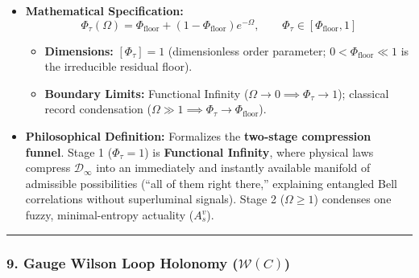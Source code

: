 \documentclass[
]{article}
\providecommand{\tightlist}{%
  \setlength{\itemsep}{0pt}\setlength{\parskip}{0pt}}
\begin{document}
\begin{itemize}
\tightlist
\item
  \textbf{Mathematical Specification:}
  \[\Phi_\tau(\Omega) = \Phi_{\mathrm{floor}} + (1 - \Phi_{\mathrm{floor}}) e^{-\Omega}, \qquad \Phi_\tau \in [\Phi_{\mathrm{floor}}, 1]\]

  \begin{itemize}
  \tightlist
  \item
    \textbf{Dimensions:} \([\Phi_\tau] = 1\) (dimensionless order
    parameter; \(0 < \Phi_{\mathrm{floor}} \ll 1\) is the irreducible
    residual floor).
  \item
    \textbf{Boundary Limits:} Functional Infinity
    (\(\Omega \to 0 \implies \Phi_\tau \to 1\)); classical record
    condensation
    (\(\Omega \gg 1 \implies \Phi_\tau \to \Phi_{\mathrm{floor}}\)).
  \end{itemize}
\item
  \textbf{Philosophical Definition:} Formalizes the \textbf{two-stage
  compression funnel}. Stage 1 (\(\Phi_\tau = 1\)) is \textbf{Functional
  Infinity}, where physical laws compress \(\mathcal{D}_\infty\) into an
  immediately and instantly available manifold of admissible
  possibilities (``all of them right there,'' explaining entangled Bell
  correlations without superluminal signals). Stage 2 (\(\Omega \ge 1\))
  condenses one fuzzy, minimal-entropy actuality (\(A_s^v\)).
\end{itemize}

\begin{center}\rule{0.5\linewidth}{0.5pt}\end{center}

\subsubsection{\texorpdfstring{9. Gauge Wilson Loop Holonomy
(\(\mathcal{W}(C)\))}{9. Gauge Wilson Loop Holonomy (\textbackslash mathcal\{W\}(C))}}\label{gauge-wilson-loop-holonomy-mathcalwc}
\end{document}
